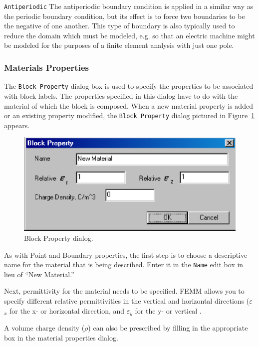 \documentclass[12pt]{report}
\begin{document}
\texttt{Antiperiodic} The antiperiodic boundary condition is
applied in a similar way as the periodic boundary condition, but
its effect is to force two boundaries to be the negative of one
another. This type of boundary is also typically used to reduce the
domain which must be modeled, e.g. so that an electric machine
might be modeled for the purposes of a finite element analysis with
just one pole.

\subsubsection{Materials Properties}

The \texttt{Block Property} dialog box is used to specify the
properties to be associated with block labels. The properties
specified in this dialog have to do with the material of which the
block is composed. When a new material property is added or an
existing property modified, the
\texttt{Block Property} dialog pictured in Figure~\ref{fig10} appears.

\begin{figure}[htbp]
\centerline{\includegraphics{belaman10.eps}}
\caption{Block Property dialog.}
\label{fig10}
\end{figure}

As with Point and Boundary properties, the first step is to choose a
descriptive name for the material that is being described. Enter it in the
\texttt{Name} edit box in lieu of ``New Material.''

Next, permittivity for the material needs to be specified. FEMM allows you
to specify different relative permittivities in the vertical and horizontal
directions (\textit{$\varepsilon $}$_{x}$ for the x- or horizontal direction, and \textit{$\varepsilon $}$_{y}$ for the y-
or vertical .

A volume charge density (\textit{$\rho $}) can also be prescribed by filling in the
appropriate box in the material properties dialog.
\end{document}
